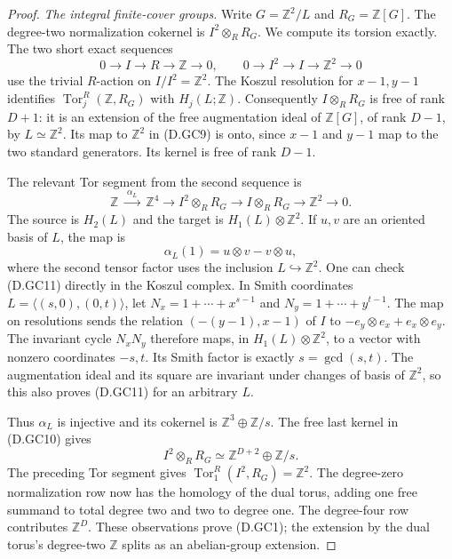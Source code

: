 \begin{proof}
\emph{The integral finite-cover groups.}
Write $G=\mathbb Z^2/L$ and $R_G=\mathbb Z[G]$.
The degree-two normalization cokernel is
$I^2\otimes_R R_G$. We compute its torsion exactly.
The two short exact sequences
\[
 0\to I\to R\to\mathbb Z\to0,\qquad
 0\to I^2\to I\to\mathbb Z^2\to0
                                                        \tag{D.GC9}
\]
use the trivial $R$-action on $I/I^2=\mathbb Z^2$.
The Koszul resolution for $x-1,y-1$ identifies
$\operatorname{Tor}^R_j(\mathbb Z,R_G)$ with
$H_j(L;\mathbb Z)$.
Consequently $I\otimes_R R_G$ is free of rank $D+1$:
it is an extension of the free augmentation ideal
of $\mathbb Z[G]$, of rank $D-1$, by $L\simeq\mathbb Z^2$.
Its map to $\mathbb Z^2$ in (D.GC9) is onto,
since $x-1$ and $y-1$ map to the two standard
generators. Its kernel is free of rank $D-1$.

The relevant Tor segment from the second sequence is
\[
 \mathbb Z\ \xrightarrow{\;\alpha_L\;}\ \mathbb Z^4
 \longrightarrow I^2\otimes_RR_G
 \longrightarrow I\otimes_RR_G
 \longrightarrow\mathbb Z^2\longrightarrow0 .
                                                        \tag{D.GC10}
\]
The source is $H_2(L)$ and the target is
$H_1(L)\otimes\mathbb Z^2$.
If $u,v$ are an oriented basis of $L$, the map is
\[
                  \alpha_L(1)=u\otimes v-v\otimes u,
                                                        \tag{D.GC11}
\]
where the second tensor factor uses the inclusion
$L\hookrightarrow\mathbb Z^2$.
One can check (D.GC11) directly in the Koszul
complex. In Smith coordinates
$L=\langle(s,0),(0,t)\rangle$, let
$N_x=1+\cdots+x^{s-1}$ and
$N_y=1+\cdots+y^{t-1}$.
The map on resolutions sends the relation
$(-(y-1),x-1)$ of $I$ to
$-e_y\otimes e_x+e_x\otimes e_y$.
The invariant cycle $N_xN_y$ therefore maps,
in $H_1(L)\otimes\mathbb Z^2$, to a vector with
nonzero coordinates $-s,t$.
Its Smith factor is exactly $s=\gcd(s,t)$.
The augmentation ideal and its square are invariant
under changes of basis of $\mathbb Z^2$, so this
also proves (D.GC11) for an arbitrary $L$.

Thus $\alpha_L$ is injective and its cokernel is
$\mathbb Z^3\oplus\mathbb Z/s$.
The free last kernel in (D.GC10) gives
\[
            I^2\otimes_RR_G
                    \simeq\mathbb Z^{D+2}\oplus\mathbb Z/s.
                                                        \tag{D.GC12}
\]
The preceding Tor segment gives
$\operatorname{Tor}_1^R(I^2,R_G)=\mathbb Z^2$.
The degree-zero normalization row now has the
homology of the dual torus, adding one free
summand to total degree two and two to degree
one. The degree-four row contributes $\mathbb Z^D$.
These observations prove (D.GC1); the extension
by the dual torus's degree-two $\mathbb Z$ splits
as an abelian-group extension.


\end{proof}

